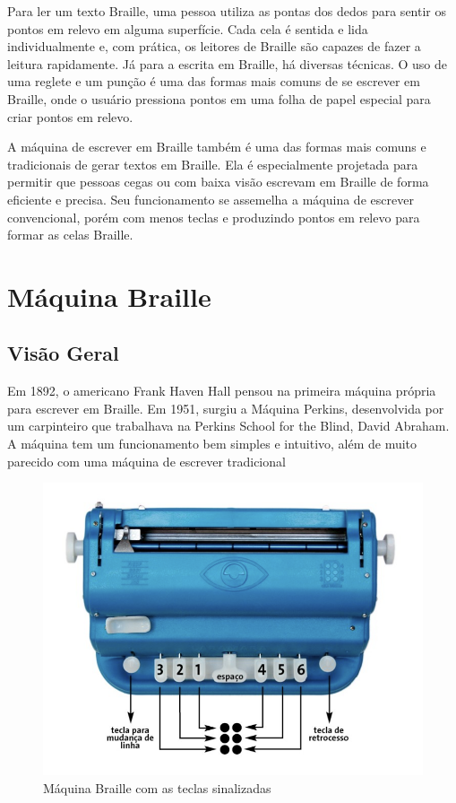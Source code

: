 Para ler um texto Braille, uma pessoa utiliza as pontas dos dedos para sentir os pontos em relevo em alguma superfície. Cada cela é sentida e lida individualmente e, com prática, os leitores de Braille são capazes de fazer a leitura rapidamente. Já para a escrita em Braille, há diversas técnicas. O uso de uma reglete e um punção é uma das formas mais comuns de se escrever em Braille, onde o usuário pressiona pontos em uma folha de papel especial para criar pontos em relevo.

A máquina de escrever em Braille também é uma das formas mais comuns e tradicionais de gerar textos em Braille. Ela é especialmente projetada para permitir que pessoas cegas ou com baixa visão escrevam em Braille de forma eficiente e precisa. Seu funcionamento se assemelha a máquina de escrever convencional, porém com menos teclas e produzindo pontos em relevo para formar as celas Braille.

\section{Máquina Braille}

\subsection{Visão Geral}

Em 1892, o americano Frank Haven Hall pensou na primeira máquina própria para escrever em Braille. Em 1951, surgiu a Máquina Perkins, desenvolvida por um carpinteiro que trabalhava na Perkins School for the Blind, David Abraham. A máquina tem um funcionamento bem simples e intuitivo, além de muito parecido com uma máquina de escrever tradicional

\begin{figure}[h]
    \centering
    \includegraphics[scale=0.5]{ch02/assets/braille-typewriter.png}
    \decoRule
    \caption[Máquina Braille]{Máquina Braille com as teclas sinalizadas}
    \label{fig:ch02-braille-typewriter}
\end{figure}

